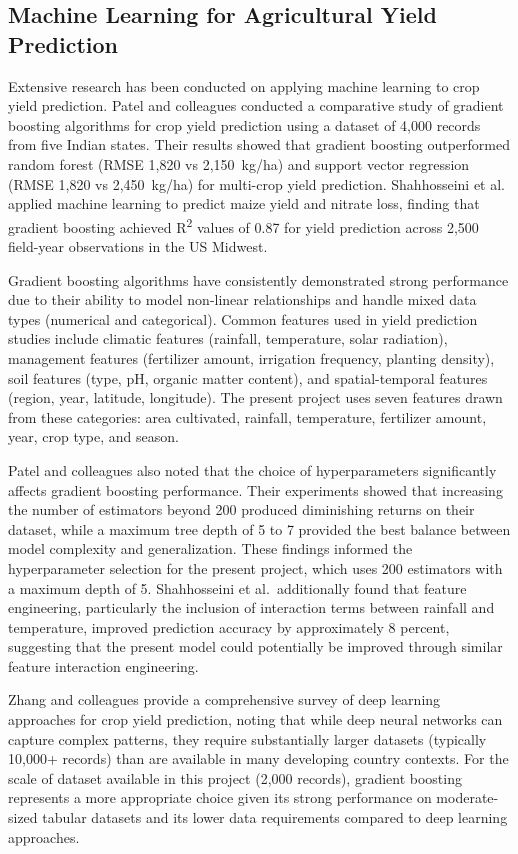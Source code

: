 \documentclass[12pt,a4paper,oneside]{report}
\begin{document}
\subsection{Machine Learning for Agricultural Yield Prediction}
Extensive research has been conducted on applying machine learning to crop yield prediction. Patel and colleagues \cite{patel2020} conducted a comparative study of gradient boosting algorithms for crop yield prediction using a dataset of 4,000 records from five Indian states. Their results showed that gradient boosting outperformed random forest (RMSE 1,820 vs 2,150~kg/ha) and support vector regression (RMSE 1,820 vs 2,450~kg/ha) for multi-crop yield prediction. Shahhosseini et al.\ \cite{shahhosseini2021} applied machine learning to predict maize yield and nitrate loss, finding that gradient boosting achieved R\textsuperscript{2} values of 0.87 for yield prediction across 2,500 field-year observations in the US Midwest.

Gradient boosting algorithms have consistently demonstrated strong performance due to their ability to model non-linear relationships and handle mixed data types (numerical and categorical). Common features used in yield prediction studies include climatic features (rainfall, temperature, solar radiation), management features (fertilizer amount, irrigation frequency, planting density), soil features (type, pH, organic matter content), and spatial-temporal features (region, year, latitude, longitude). The present project uses seven features drawn from these categories: area cultivated, rainfall, temperature, fertilizer amount, year, crop type, and season.

Patel and colleagues also noted that the choice of hyperparameters significantly affects gradient boosting performance. Their experiments showed that increasing the number of estimators beyond 200 produced diminishing returns on their dataset, while a maximum tree depth of 5 to 7 provided the best balance between model complexity and generalization. These findings informed the hyperparameter selection for the present project, which uses 200 estimators with a maximum depth of 5. Shahhosseini et al.\ additionally found that feature engineering, particularly the inclusion of interaction terms between rainfall and temperature, improved prediction accuracy by approximately 8 percent, suggesting that the present model could potentially be improved through similar feature interaction engineering.

Zhang and colleagues \cite{zhang2018} provide a comprehensive survey of deep learning approaches for crop yield prediction, noting that while deep neural networks can capture complex patterns, they require substantially larger datasets (typically 10,000+ records) than are available in many developing country contexts. For the scale of dataset available in this project (2,000 records), gradient boosting represents a more appropriate choice given its strong performance on moderate-sized tabular datasets and its lower data requirements compared to deep learning approaches.
\end{document}
